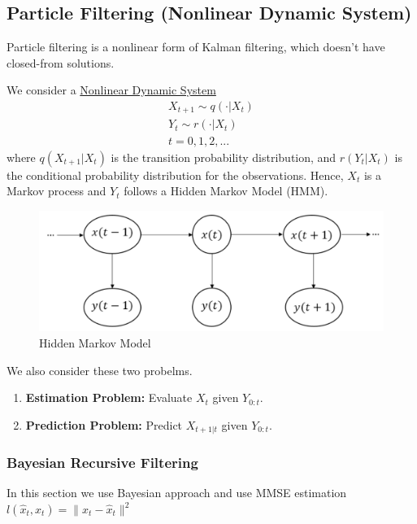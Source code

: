 \documentclass[11pt,a4paper]{article}
\begin{document}
\subsection{Particle Filtering (Nonlinear Dynamic System)}
Particle filtering is a nonlinear form of Kalman filtering, which doesn't have closed-from solutions.

We consider a \underline{Nonlinear Dynamic System}
\begin{equation}
    \begin{aligned}
        X_{t+1}\sim q(\cdot|X_t)\\
        Y_{t}\sim r(\cdot|X_t)\\t=0,1,2,...
    \end{aligned}
    \nonumber
\end{equation}
where $q(X_{t+1}|X_t)$ is the transition probability distribution, and $r(Y_t|X_t)$ is the conditional probability distribution for the observations. Hence, $X_t$ is a Markov process and $Y_t$ follows a Hidden Markov Model (HMM).
\begin{center}\begin{figure}[htbp]
    \centering
    \includegraphics[scale=0.2]{HMM.png}
    \caption{Hidden Markov Model}
    \label{}
\end{figure}\end{center}
We also consider these two probelms.
\begin{enumerate}
    \item \textbf{Estimation Problem:} Evaluate $X_t$ given $Y_{0:t}$.
    \item \textbf{Prediction Problem:} Predict $X_{t+1|t}$ given $Y_{0:t}$.
\end{enumerate}

\subsubsection{Bayesian Recursive Filtering}
In this section we use Bayesian approach and use MMSE estimation $l(\hat{x}_t,x_t)=\|x_t-\hat{x}_t\|^2$
\end{document}
